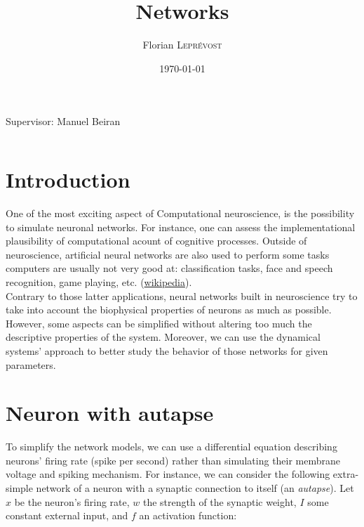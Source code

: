 \documentclass{article}
\title{Networks} %
\author{Florian \textsc{Leprévost}} %
\date{\today} %
\begin{document}
\maketitle %

\noindent Supervisor: Manuel Beiran %
\tableofcontents

\begin{center}
\begin{tabular}{l r}

\end{tabular}
\end{center}


\section{Introduction}\label{introduction}

\indent\indent One of the most exciting aspect of Computational neuroscience, is the possibility to simulate neuronal networks. For instance, one can assess the implementational plausibility of computational acount of cognitive processes. Outside of neuroscience, artificial neural networks are also used to perform some tasks computers are usually not very good at: classification tasks, face and speech recognition, game playing, etc. (\href{https://en.wikipedia.org/wiki/Artificial_neural_network}{wikipedia}).\\

\indent Contrary to those latter applications, neural networks built in neuroscience try to take into account the biophysical properties of neurons as much as possible. However, some aspects can be simplified without altering too much the descriptive properties of the system. Moreover, we can use the dynamical systems' approach to better study the behavior of those networks for given parameters.\\

\section{Neuron with autapse}\label{autapse}
\indent\indent To simplify the network models, we can use a differential equation describing neurons' firing rate (spike per second) rather than simulating their membrane voltage and spiking mechanism. For instance, we can consider the following extra-simple network of a neuron with a synaptic connection to itself (an \textit{autapse}). Let $x$ be the neuron's firing rate, $w$ the strength of the synaptic weight, $I$ some constant external input, and $f$ an activation function:
\end{document}
